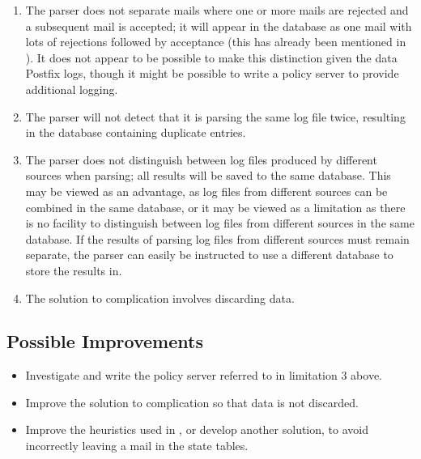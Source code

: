 \begin{enumerate}
    \item The parser does not separate mails where one or more mails are
        rejected and a subsequent mail is accepted; it will appear in the
        database as one mail with lots of rejections followed by acceptance
        (this has already been mentioned in ).
        It does not appear to be possible to make this distinction given
        the data Postfix logs, though it might be possible to write a
        policy server to provide additional logging.

    \item The parser will not detect that it is parsing the same log file
        twice, resulting in the database containing duplicate entries.

    \item The parser does not distinguish between log files produced by
        different sources when parsing; all results will be saved to the
        same database.  This may be viewed as an advantage, as log files
        from different sources can be combined in the same database, or it
        may be viewed as a limitation as there is no facility to
        distinguish between log files from different sources in the same
        database.  If the results of parsing log files from different
        sources must remain separate, the parser can easily be instructed
        to use a different database to store the results in.

    \item The solution to complication  involves discarding data.

\end{enumerate}

\subsection{Possible Improvements}

\begin{itemize}

    \item Investigate and write the policy server referred to in limitation
        3 above.

    \item Improve the solution to complication  so that data is not discarded.

    \item Improve the heuristics used in , or develop another solution, to avoid incorrectly leaving a
        mail in the state tables.

\end{itemize}


